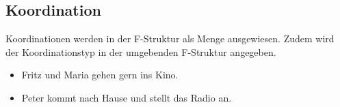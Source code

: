 

\subsection{Koordination}
Koordinationen werden in der F-Struktur als Menge ausgewiesen. Zudem wird der Koordinationstyp in der umgebenden F-Struktur angegeben.
\begin{itemize}
	\item Fritz und Maria gehen gern ins Kino.
	\item Peter kommt nach Hause und stellt das Radio an.
\end{itemize}




